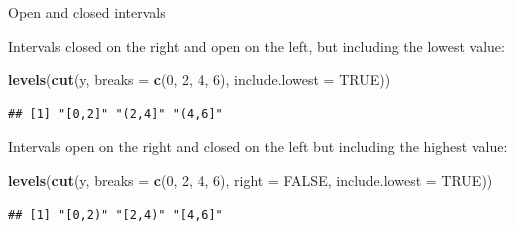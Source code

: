 \documentclass[ignorenonframetext,]{beamer}
\newenvironment{Shaded}{\begin{snugshade}}{\end{snugshade}}
\newcommand{\DataTypeTok}[1]{\textcolor[rgb]{0.13,0.29,0.53}{#1}}
\newcommand{\DecValTok}[1]{\textcolor[rgb]{0.00,0.00,0.81}{#1}}
\newcommand{\KeywordTok}[1]{\textcolor[rgb]{0.13,0.29,0.53}{\textbf{#1}}}
\newcommand{\NormalTok}[1]{#1}
\newcommand{\OtherTok}[1]{\textcolor[rgb]{0.56,0.35,0.01}{#1}}
\begin{document}
\begin{frame}[fragile]{Open and closed intervals}
\protect\hypertarget{open-and-closed-intervals-1}{}

Intervals closed on the right and open on the left, but including the
lowest value:

\begin{Shaded}
\begin{Highlighting}[]
\KeywordTok{levels}\NormalTok{(}\KeywordTok{cut}\NormalTok{(y, }\DataTypeTok{breaks =} \KeywordTok{c}\NormalTok{(}\DecValTok{0}\NormalTok{, }\DecValTok{2}\NormalTok{, }\DecValTok{4}\NormalTok{, }\DecValTok{6}\NormalTok{),}
             \DataTypeTok{include.lowest =} \OtherTok{TRUE}\NormalTok{)) }
\end{Highlighting}
\end{Shaded}

\begin{verbatim}
## [1] "[0,2]" "(2,4]" "(4,6]"
\end{verbatim}

Intervals open on the right and closed on the left but including the
highest value:

\begin{Shaded}
\begin{Highlighting}[]
\KeywordTok{levels}\NormalTok{(}\KeywordTok{cut}\NormalTok{(y, }\DataTypeTok{breaks =} \KeywordTok{c}\NormalTok{(}\DecValTok{0}\NormalTok{, }\DecValTok{2}\NormalTok{, }\DecValTok{4}\NormalTok{, }\DecValTok{6}\NormalTok{), }\DataTypeTok{right =} \OtherTok{FALSE}\NormalTok{, }
             \DataTypeTok{include.lowest =} \OtherTok{TRUE}\NormalTok{)) }
\end{Highlighting}
\end{Shaded}

\begin{verbatim}
## [1] "[0,2)" "[2,4)" "[4,6]"
\end{verbatim}

\end{frame}
\end{document}
